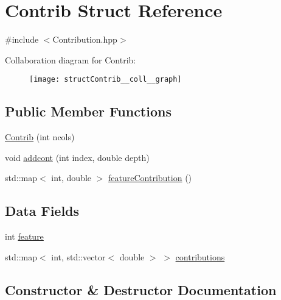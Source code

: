 \hypertarget{structContrib}{}\section{Contrib Struct Reference}
\label{structContrib}


{\ttfamily \#include $<$Contribution.\+hpp$>$}



Collaboration diagram for Contrib\+:\nopagebreak
\begin{figure}[H]
\begin{center}
\leavevmode
\texttt{[image: structContrib\_\_coll\_\_graph]}
\end{center}
\end{figure}
\subsection*{Public Member Functions}
\begin{DoxyCompactItemize}
\item 
\hyperlink{structContrib_af03799ba9bb8cf2a603d334d1be68780}{Contrib} (int ncols)
\item 
void \hyperlink{structContrib_a03900805a2d1b5452f62d347511bec90}{addcont} (int index, double depth)
\item 
std\+::map$<$ int, double $>$ \hyperlink{structContrib_ab3a6d22d834b8fa669b436672d21dd0b}{feature\+Contribution} ()
\end{DoxyCompactItemize}
\subsection*{Data Fields}
\begin{DoxyCompactItemize}
\item 
int \hyperlink{structContrib_ad6106fc9377c5d7025631449db2e322c}{feature}
\item 
std\+::map$<$ int, std\+::vector$<$ double $>$ $>$ \hyperlink{structContrib_adfd8e1bb6847746d18bdeced40876b59}{contributions}
\end{DoxyCompactItemize}


\subsection{Constructor \& Destructor Documentation}
\mbox{\label{structContrib_af03799ba9bb8cf2a603d334d1be68780}} 
